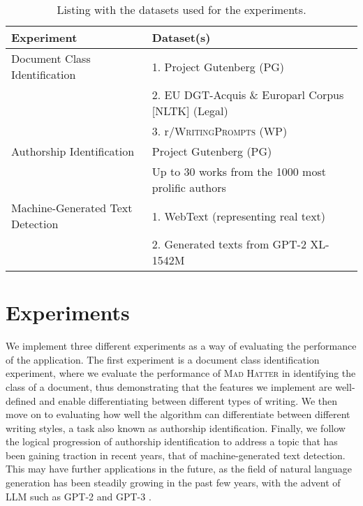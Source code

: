 \begin{table}[htbp]
    \centering
    \begin{tabular}{ll}
        \toprule
        Experiment & Dataset(s) \\
        \midrule
        Document Class Identification & 1. Project Gutenberg (PG) \\
        & 2. EU DGT-Acquis \& Europarl Corpus [NLTK] (Legal) \\
        & 3. r/\textsc{WritingPrompts} (WP) \\
        \midrule
        Authorship Identification & Project Gutenberg (PG) \\
        & Up to 30 works from the 1000 most prolific authors \\
        \midrule
        Machine-Generated Text Detection & 1. WebText (representing real text)  \\
        & 2. Generated texts from GPT-2 XL-1542M\\

        
        \bottomrule 
    \end{tabular}
    \caption{Listing with the datasets used for the experiments.}
    \label{tab:used_datasets}
\end{table}


\section{Experiments}
We implement three different experiments as a way of evaluating the performance of the application. The first experiment is a document class identification experiment, where we evaluate the performance of \textsc{Mad Hatter} in identifying the class of a document, thus demonstrating that the features we implement are well-defined and enable differentiating between different types of writing. We then move on to evaluating how well the algorithm can differentiate between different writing styles, a task also known as authorship identification. Finally, we follow the logical progression of authorship identification to address a topic that has been gaining traction in recent years, that of machine-generated text detection. This may have further applications in the future, as the field of natural language generation has been steadily growing in the past few years, with the advent of LLM such as GPT-2 \citep{radford2019_gpt2} and GPT-3 \citep{brown_gpt3_2020}.  

